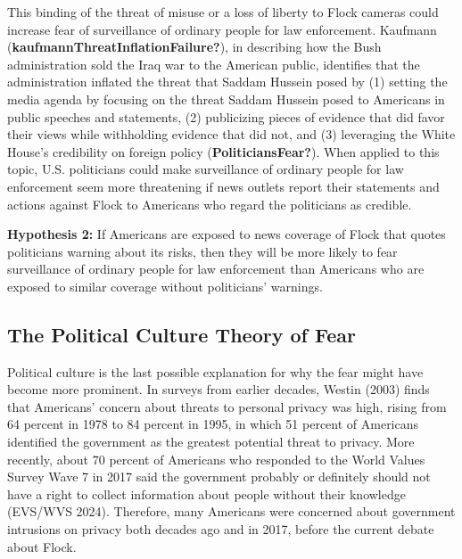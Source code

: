 \documentclass[
  american,
  12pt,
  letterpaper,
]{article}
\renewenvironment{quote}
  {
    \par
    \addvspace{\baselineskip}
    \begin{singlespace}
    \begin{list}{}{%
      \setlength{\leftmargin}{0.5in}%
      \setlength{\rightmargin}{0in}%
      \setlength{\topsep}{0pt}%
      \setlength{\partopsep}{0pt}%
      \setlength{\parsep}{0pt}%
      \setlength{\itemsep}{0pt}%
    }
    \item\relax
  }
  {
    \end{list}
    \end{singlespace}
    \par
    \addvspace{\baselineskip}
  }
\begin{document}
This binding of the threat of misuse or a loss of liberty to Flock
cameras could increase fear of surveillance of ordinary people for law
enforcement. Kaufmann (\textbf{kaufmannThreatInflationFailure?}), in
describing how the Bush administration sold the Iraq war to the American
public, identifies that the administration inflated the threat that
Saddam Hussein posed by (1) setting the media agenda by focusing on the
threat Saddam Hussein posed to Americans in public speeches and
statements, (2) publicizing pieces of evidence that did favor their
views while withholding evidence that did not, and (3) leveraging the
White House's credibility on foreign policy (\textbf{PoliticiansFear?}).
When applied to this topic, U.S. politicians could make surveillance of
ordinary people for law enforcement seem more threatening if news
outlets report their statements and actions against Flock to Americans
who regard the politicians as credible.

\begin{quote}
\textbf{Hypothesis 2:} If Americans are exposed to news coverage of
Flock that quotes politicians warning about its risks, then they will be
more likely to fear surveillance of ordinary people for law enforcement
than Americans who are exposed to similar coverage without politicians'
warnings.
\end{quote}

\subsection{The Political Culture Theory of
Fear}\label{the-political-culture-theory-of-fear}

Political culture is the last possible explanation for why the fear
might have become more prominent. In surveys from earlier decades,
Westin (2003) finds that Americans' concern about threats to personal
privacy was high, rising from 64 percent in 1978 to 84 percent in 1995,
in which 51 percent of Americans identified the government as the
greatest potential threat to privacy. More recently, about 70 percent of
Americans who responded to the World Values Survey Wave 7 in 2017 said
the government probably or definitely should not have a right to collect
information about people without their knowledge (EVS/WVS 2024).
Therefore, many Americans were concerned about government intrusions on
privacy both decades ago and in 2017, before the current debate about
Flock.
\end{document}
